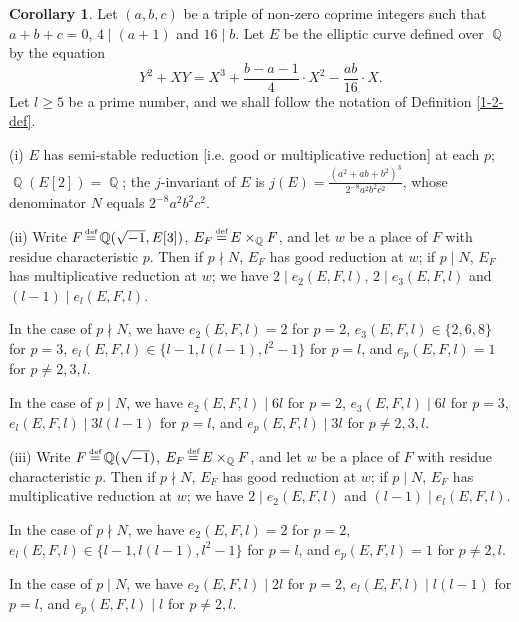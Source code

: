 \documentclass[a4paper, 12pt]{article}
\DeclareMathOperator{\defeq}{\overset{\text{\tiny{def}}}{=}}
\DeclareMathOperator{\Q}{\mathbb{Q}}
\numberwithin{equation}{section}
\theoremstyle{definition}
\newtheorem{cor}[thm]{Corollary}
\begin{document}
\begin{cor} \label{1-2-cor1}
Let $(a,b,c)$ be a triple of non-zero coprime integers such that $a+b+c = 0$, $4\mid (a+1)$ and $16\mid b$.
Let $E$ be the elliptic curve defined over $\Q$ by the equation 
$$Y^2 + XY = X^3 + \frac{b-a-1}{4}\cdot X^2 - \frac{ab}{16}\cdot X .$$
Let $l\ge 5$ be a prime number, and we shall follow the notation of Definition \ref{1-2-def}.

(i) $E$ has semi-stable reduction [i.e. good or multiplicative reduction] at each $p$;
$\Q(E[2]) = \Q$; the $j$-invariant of $E$ is $j(E) = \frac{(a^2+ab+b^2)^3}{2^{-8}a^2b^2c^2}$,
 whose denominator $N$ equals $2^{-8}a^2b^2c^2$.

(ii) Write $F\defeq \Q(\sqrt{-1}, E[3])$, $E_F \defeq E\times_{\Q} F$, and let $w$ be a place of $F$ with residue characteristic $p$. 
Then if $p \nmid N$, $E_F$ has good reduction at $w$; if $p \mid N$, $E_F$ has multiplicative reduction at $w$; we have $2\mid e_2(E,F,l)$, $2\mid e_3(E,F,l)$ and $(l-1) \mid e_l(E,F,l)$.

In the case of $p \nmid N$, we have 
$e_2(E,F,l) = 2$ for $p=2$, $e_3(E,F,l) \in \{2,6,8\}$ for $p=3$, $e_l(E,F,l) \in \{l-1, l(l-1), l^2-1\}$ for $p=l$, and $e_p(E,F,l) = 1$ for $p\neq 2,3,l$.

In the case of $p \mid N$, we have
$e_2(E,F,l) \mid 6l$ for $p=2$, $e_3(E,F,l) \mid 6l$ for $p=3$, $e_l(E,F,l) \mid 3l(l-1)$ for $p=l$, and $e_p(E,F,l) \mid 3l$ for $p\neq 2,3,l$.

(iii) Write $F\defeq \Q(\sqrt{-1})$, $E_F \defeq E\times_{\Q} F$, and let $w$ be a place of $F$ with residue characteristic $p$. 
Then if $p \nmid N$, $E_F$ has good reduction at $w$; if $p \mid N$, $E_F$ has multiplicative reduction at $w$; we have $2\mid e_2(E,F,l)$ and $(l-1) \mid e_l(E,F,l)$.

In the case of $p \nmid N$,  we have 
$e_2(E,F,l) = 2$ for $p=2$, $e_l(E,F,l) \in \{l-1, l(l-1), l^2-1\}$ for $p=l$, and $e_p(E,F,l) = 1$ for $p\neq 2, l$.

In the case of $p \mid N$, we have
$e_2(E,F,l) \mid 2l$ for $p=2$, 
$e_l(E,F,l) \mid l (l-1)$ for $p=l$, 
and $e_p(E,F,l) \mid l$ for $p\neq 2, l$.
\end{cor}
\end{document}
